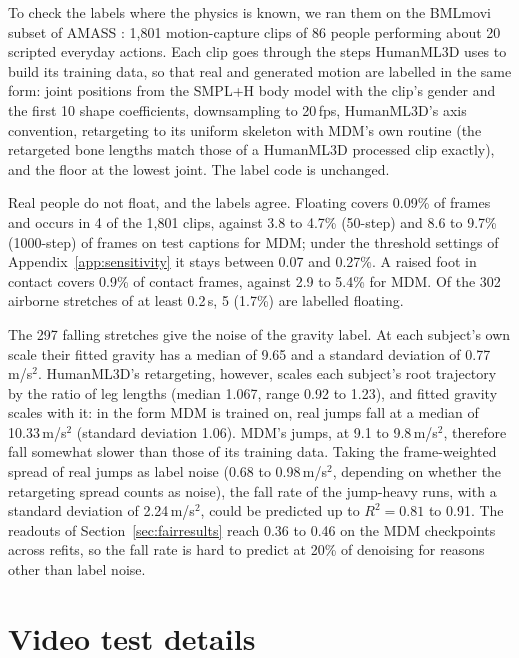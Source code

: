 To check the labels where the physics is known, we ran them on the BMLmovi subset of AMASS \citep{mahmood2019amass,ghorbani2021movi}: 1,801 motion-capture clips of 86 people performing about 20 scripted everyday actions. Each clip goes through the steps HumanML3D uses to build its training data, so that real and generated motion are labelled in the same form: joint positions from the SMPL+H body model \citep{romero2017mano} with the clip's gender and the first 10 shape coefficients, downsampling to 20\,fps, HumanML3D's axis convention, retargeting to its uniform skeleton with MDM's own routine (the retargeted bone lengths match those of a HumanML3D processed clip exactly), and the floor at the lowest joint. The label code is unchanged.

Real people do not float, and the labels agree. Floating covers 0.09\% of frames and occurs in 4 of the 1,801 clips, against 3.8 to 4.7\% (50-step) and 8.6 to 9.7\% (1000-step) of frames on test captions for MDM; under the threshold settings of Appendix~\ref{app:sensitivity} it stays between 0.07 and 0.27\%. A raised foot in contact covers 0.9\% of contact frames, against 2.9 to 5.4\% for MDM. Of the 302 airborne stretches of at least 0.2\,s, 5 (1.7\%) are labelled floating.

The 297 falling stretches give the noise of the gravity label. At each subject's own scale their fitted gravity has a median of 9.65 and a standard deviation of 0.77\,m/s$^2$. HumanML3D's retargeting, however, scales each subject's root trajectory by the ratio of leg lengths (median 1.067, range 0.92 to 1.23), and fitted gravity scales with it: in the form MDM is trained on, real jumps fall at a median of 10.33\,m/s$^2$ (standard deviation 1.06). MDM's jumps, at 9.1 to 9.8\,m/s$^2$, therefore fall somewhat slower than those of its training data. Taking the frame-weighted spread of real jumps as label noise (0.68 to 0.98\,m/s$^2$, depending on whether the retargeting spread counts as noise), the fall rate of the jump-heavy runs, with a standard deviation of 2.24\,m/s$^2$, could be predicted up to $R^2 = 0.81$ to 0.91. The readouts of Section~\ref{sec:fairresults} reach 0.36 to 0.46 on the MDM checkpoints across refits, so the fall rate is hard to predict at 20\% of denoising for reasons other than label noise.

\section{Video test details}
\label{app:video}

